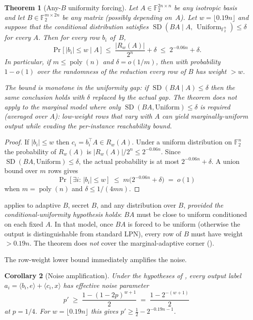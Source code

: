 \documentclass[11pt,a4paper]{article}
\theoremstyle{plain}
\newtheorem{theorem}{Theorem}[section]
\newtheorem{corollary}[theorem]{Corollary}
\theoremstyle{definition}
\newcommand{\F}{\mathbb{F}}
\begin{document}
\begin{theorem}[Any-$B$ uniformity forcing]
\label{thm:any-b-uniformity}
Let $A\in\F_2^{2n\times n}$ be any isotropic basis and let $B\in\F_2^{m\times 2n}$ be any matrix (possibly depending on~$A$).  Let $w=\lfloor 0.19n\rfloor$ and suppose that the conditional distribution satisfies $\operatorname{SD}(BA\mid A,\,\operatorname{Uniform}_{\F_2^{n}})\le\delta$ for every $A$.  Then for every row $b_i$ of~$B$,
\[
\Pr\bigl[\,|b_i|\le w \mid A\,\bigr] \;\le\; \frac{|R_w(A)|}{2^{n}} + \delta \;\le\; 2^{-0.06n}+\delta.
\]
In particular, if $m\le\operatorname{poly}(n)$ and $\delta=o(1/m)$, then with probability $1-o(1)$ over the randomness of the reduction \emph{every} row of $B$ has weight $>w$.

The bound is \emph{monotone in the uniformity gap}: if $\operatorname{SD}(BA\mid A)\le\delta$ then the same conclusion holds with $\delta$ replaced by the actual gap.  The theorem does \emph{not} apply to the marginal model where only $\operatorname{SD}(BA,\text{Uniform})\le\delta$ is required (averaged over $A$): low-weight rows that vary with $A$ can yield marginally-uniform output while evading the per-instance reachability bound.
\end{theorem}

\begin{proof}
If $|b_i|\le w$ then $c_i=b_i^{\!\top}A\in R_w(A)$.  Under a uniform distribution on $\F_2^{n}$ the probability of $R_w(A)$ is $|R_w(A)|/2^{n}\le 2^{-0.06n}$.  Since $\operatorname{SD}(BA,\text{Uniform})\le\delta$, the actual probability is at most $2^{-0.06n}+\delta$.  A union bound over $m$ rows gives
\[
\Pr[\exists i:\,|b_i|\le w]\;\le\; m\bigl(2^{-0.06n}+\delta\bigr)\;=\;o(1)
\]
when $m=\operatorname{poly}(n)$ and $\delta\le 1/(4mn)$.
\end{proof}

 applies to adaptive $B$, secret $B$, and any distribution over $B$, \emph{provided the conditional-uniformity hypothesis holds}: $BA$ must be close to uniform conditioned on each fixed $A$. In that model, once $BA$ is forced to be uniform (otherwise the output is distinguishable from standard LPN), every row of $B$ must have weight $>0.19n$. The theorem does \emph{not} cover the marginal-adaptive corner ().

The row-weight lower bound immediately amplifies the noise.

\begin{corollary}[Noise amplification]
\label{cor:noise-amp}
Under the hypotheses of , every output label $a_i=\langle b_i,e\rangle+\langle c_i,x\rangle$ has effective noise parameter
\[
p' \;\ge\; \frac{1-(1-2p)^{w+1}}{2} \;=\; \frac{1-2^{-(w+1)}}{2}
\]
at $p=1/4$.  For $w=\lfloor 0.19n\rfloor$ this gives $p'\ge \tfrac12-2^{-0.19n-1}$.
\end{corollary}
\end{document}
